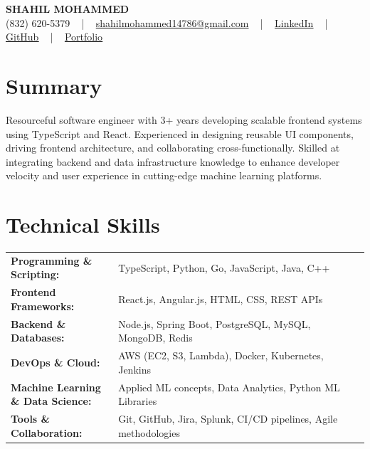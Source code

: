 \documentclass[letterpaper,11pt]{article}
\begin{document}
\begin{center}
    {\fontsize{14pt}{12pt}\selectfont \textbf{\MakeUppercase{Shahil Mohammed}}}\\ \vspace{2pt}
    \fontsize{10pt}{12pt}\selectfont (832) 620-5379 ~ | ~ \href{mailto:shahilmohammed14786@gmail.com}{shahilmohammed14786@gmail.com} ~ | ~  
    \href{https://www.linkedin.com/in/shahil-mohammed-9652931a1/}{\color{blue}\underline{LinkedIn}}  ~ | ~ 
    \href{https://github.com/freakbeast14}{\color{blue}\underline{GitHub}} ~ | ~ 
    \href{https://shahil-mohammed.netlify.app/}{\color{blue}\underline{Portfolio}}
    \vspace{-8pt}
\end{center}

\section{Summary}
\fontsize{9pt}{10pt}\selectfont
Resourceful software engineer with 3+ years developing scalable frontend systems using TypeScript and React. Experienced in designing reusable UI components, driving frontend architecture, and collaborating cross-functionally. Skilled at integrating backend and data infrastructure knowledge to enhance developer velocity and user experience in cutting-edge machine learning platforms.
 \vspace{-5pt}
 
\section{Technical Skills}
        \vspace{-14pt}
        \begin{table}[h]
            \fontsize{9pt}{10pt}\selectfont
            \begin{tabular}{p{0.3\linewidth} p{0.7\linewidth}}
                \textbf{Programming \& Scripting:} & TypeScript, Python, Go, JavaScript, Java, C++ \\
                \textbf{Frontend Frameworks:} & React.js, Angular.js, HTML, CSS, REST APIs \\
                \textbf{Backend \& Databases:} & Node.js, Spring Boot, PostgreSQL, MySQL, MongoDB, Redis \\
                \textbf{DevOps \& Cloud:} & AWS (EC2, S3, Lambda), Docker, Kubernetes, Jenkins \\
                \textbf{Machine Learning \& Data Science:} & Applied ML concepts, Data Analytics, Python ML Libraries \\
                \textbf{Tools \& Collaboration:} & Git, GitHub, Jira, Splunk, CI/CD pipelines, Agile methodologies \\
            \end{tabular}
        \end{table}
 \vspace{-15pt}
 
\end{document}
